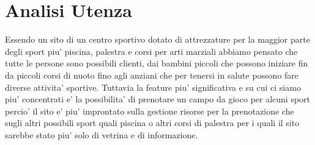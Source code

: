 \section{Analisi Utenza}

Essendo un sito di un centro sportivo dotato di attrezzature per la maggior parte degli sport piu' piscina, palestra e corsi per arti marziali abbiamo pensato che tutte le persone sono possibili clienti, dai bambini piccoli che possono iniziare fin da piccoli corsi di nuoto fino agli anziani che per tenersi in salute possono fare diverse attivita' sportive.
Tuttavia la feature piu' significativa e su cui ci siamo piu' concentrati e' la possibilita' di prenotare un campo da gioco per alcuni sport percio' il sito e' piu' improntato sulla gestione risorse per la prenotazione che sugli altri possibili sport quali piscina o altri corsi di palestra per i quali il sito sarebbe stato piu' solo di vetrina e di informazione.
